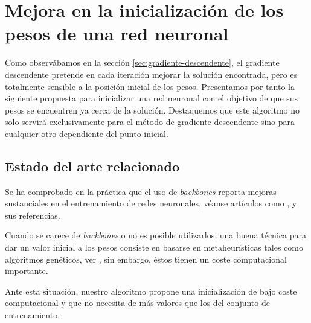 \chapter{ Mejora en la inicialización de los pesos de una red neuronal}  
\label{section:inicializar_pesos}
Como observábamos en la sección \ref{sec:gradiente-descendente}, el gradiente descendente pretende en cada 
iteración mejorar la solución encontrada, pero es 
totalmente sensible a la posición inicial 
de los pesos. 
Presentamos por tanto la siguiente propuesta para inicializar una red neuronal con el objetivo de que sus pesos se encuentren ya cerca de la solución. Destaquemos que este algoritmo 
no solo servirá exclusivamente para el método de gradiente descendente 
sino para cualquier otro dependiente del punto inicial. 

\section{ Estado del arte relacionado } 

\setlength{\marginparwidth}{\bigMarginSize}

Se ha comprobado en la práctica que el uso de 
\textit{backbones} reporta mejoras sustanciales en el 
entrenamiento de redes neuronales, véanse artículos como \cite{backbone-object-detection}, \cite{backbone-Architecture} y sus referencias. 

Cuando se carece de \textit{backbones} o no es posible utilizarlos, una buena técnica para dar un valor inicial  a los pesos consiste en basarse en metaheurísticas tales como algoritmos genéticos,
ver \cite{Montana2002NeuralNW}, sin embargo, éstos 
tienen un coste computacional importante. 

Ante esta situación, nuestro algoritmo propone una inicialización de bajo coste computacional y que no necesita de más valores que los del conjunto de entrenamiento. 



